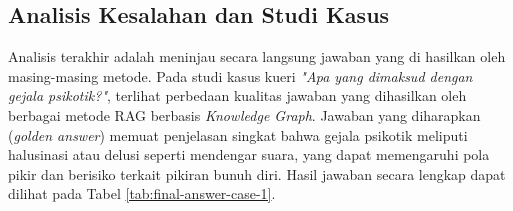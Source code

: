 \subsection{Analisis Kesalahan dan Studi Kasus}

Analisis terakhir adalah meninjau secara langsung jawaban yang di hasilkan oleh masing-masing metode.
Pada studi kasus kueri \textit{"Apa yang dimaksud dengan gejala psikotik?"}, terlihat perbedaan kualitas jawaban yang dihasilkan oleh berbagai metode RAG berbasis \textit{Knowledge Graph}.
Jawaban yang diharapkan (\textit{golden answer}) memuat penjelasan singkat bahwa gejala psikotik meliputi halusinasi atau delusi seperti mendengar suara, yang dapat memengaruhi pola pikir dan berisiko terkait pikiran bunuh diri.
Hasil jawaban secara lengkap dapat dilihat pada Tabel \ref{tab:final-answer-case-1}.


